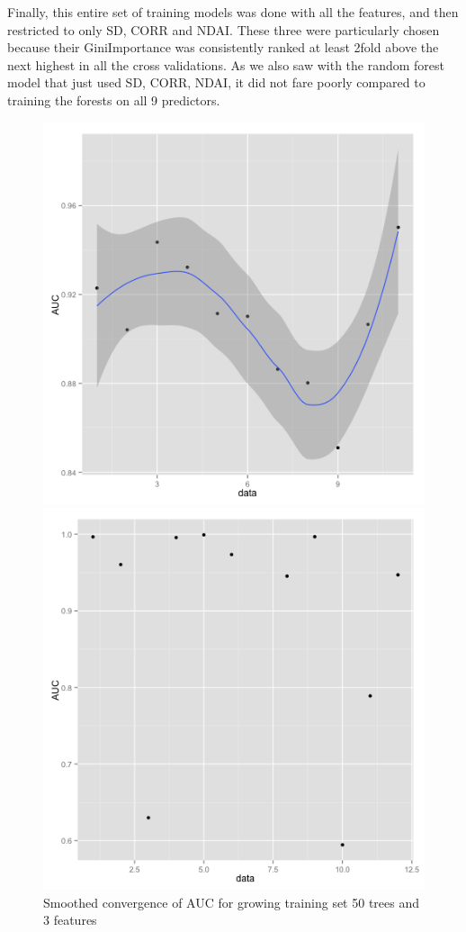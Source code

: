 \documentclass{article}\usepackage[]{graphicx}\usepackage[]{color}
\begin{document}
Finally, this entire set of training models was done with all the features, and then restricted to only SD, CORR and NDAI.  These three were particularly chosen because their GiniImportance was consistently ranked at least 2fold above the next highest in all the cross validations. As we also saw with the random forest model that just used SD, CORR, NDAI, it did not fare poorly compared to training the forests on all 9 predictors.  

\begin{figure}[h]
  \includegraphics[width=\linewidth]{AUCconverge.png}
  \caption{Smoothed convergence of AUC for growing training set 50 trees and 3 features}\label{}
\endminipage\hfill
{}
  \includegraphics[width=\linewidth]{CVAUC.png}

\end{figure}
\end{document}
